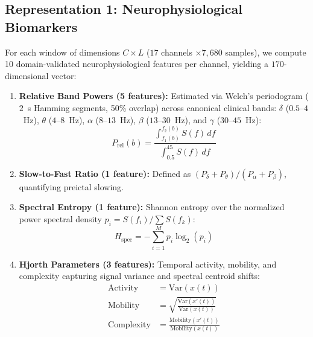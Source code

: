 \documentclass[10pt,journal,compsoc]{IEEEtran}
\begin{document}
\subsection{Representation 1: Neurophysiological Biomarkers}
For each window of dimensions $C \times L$ ($17$ channels $\times 7{,}680$ samples), we compute 10 domain-validated neurophysiological features per channel, yielding a $170$-dimensional vector:
\begin{enumerate}
    \item \textbf{Relative Band Powers (5 features):} Estimated via Welch's periodogram ($2$~s Hamming segments, 50\% overlap) across canonical clinical bands: $\delta$ ($0.5$--$4$~Hz), $\theta$ ($4$--$8$~Hz), $\alpha$ ($8$--$13$~Hz), $\beta$ ($13$--$30$~Hz), and $\gamma$ ($30$--$45$~Hz):
    \begin{equation}
        P_{\text{rel}}(b) = \frac{\int_{f_1(b)}^{f_2(b)} S(f) \, df}{\int_{0.5}^{45} S(f) \, df}
    \end{equation}
    \item \textbf{Slow-to-Fast Ratio (1 feature):} Defined as $(P_\delta + P_\theta) / (P_\alpha + P_\beta)$, quantifying preictal slowing.
    \item \textbf{Spectral Entropy (1 feature):} Shannon entropy over the normalized power spectral density $p_i = S(f_i)/\sum S(f_k)$:
    \begin{equation}
        H_{\text{spec}} = -\sum_{i=1}^M p_i \log_2(p_i)
    \end{equation}
    \item \textbf{Hjorth Parameters (3 features):} Temporal activity, mobility, and complexity capturing signal variance and spectral centroid shifts:
    \begin{align}
        \text{Activity} &= \text{Var}(x(t)) \\
        \text{Mobility} &= \sqrt{\frac{\text{Var}(x'(t))}{\text{Var}(x(t))}} \\
        \text{Complexity} &= \frac{\text{Mobility}(x'(t))}{\text{Mobility}(x(t))}
    \end{align}
\end{enumerate}
\end{document}
